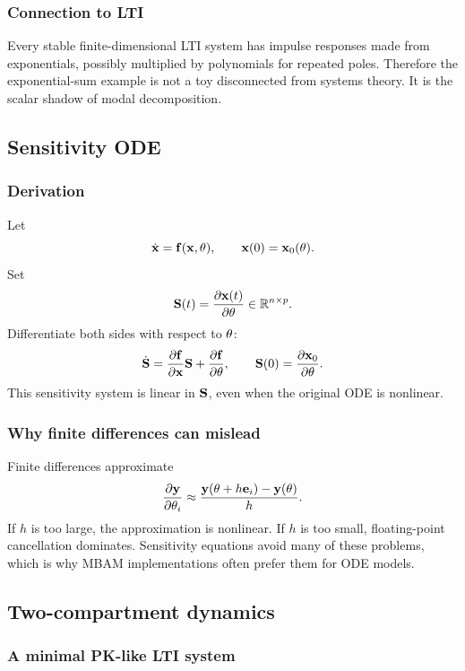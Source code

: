 \subsubsection*{Connection to LTI}

Every stable finite-dimensional LTI system has impulse responses made from exponentials, possibly multiplied by polynomials for repeated poles.  Therefore the exponential-sum example is not a toy disconnected from systems theory.  It is the scalar shadow of modal decomposition.

\subsection{Sensitivity ODE}

\subsubsection*{Derivation}

Let
\[
  \dot{\mathbf{x}}=\mathbf{f}(\mathbf{x},\theta),
  \qquad
  \mathbf{x}(0)=\mathbf{x}_0(\theta).
\]
Set
\[
  \mathbf{S}(t)=\frac{\partial \mathbf{x}(t)}{\partial \theta}
  \in\mathbb{R}^{n\times p}.
\]
Differentiate both sides with respect to \(\theta\):
\[
  \dot{\mathbf{S}}
  =
  \frac{\partial \mathbf{f}}{\partial \mathbf{x}}\mathbf{S}
  +
  \frac{\partial \mathbf{f}}{\partial \theta},
  \qquad
  \mathbf{S}(0)=\frac{\partial \mathbf{x}_0}{\partial \theta}.
\]
This sensitivity system is linear in \(\mathbf{S}\), even when the original ODE is nonlinear.

\subsubsection*{Why finite differences can mislead}

Finite differences approximate
\[
  \frac{\partial \mathbf{y}}{\partial \theta_i}
  \approx
  \frac{\mathbf{y}(\theta+h\mathbf{e}_i)-\mathbf{y}(\theta)}{h}.
\]
If \(h\) is too large, the approximation is nonlinear.  If \(h\) is too small, floating-point cancellation dominates.  Sensitivity equations avoid many of these problems, which is why MBAM implementations often prefer them for ODE models.

\subsection{Two-compartment dynamics}

\subsubsection*{A minimal PK-like LTI system}

